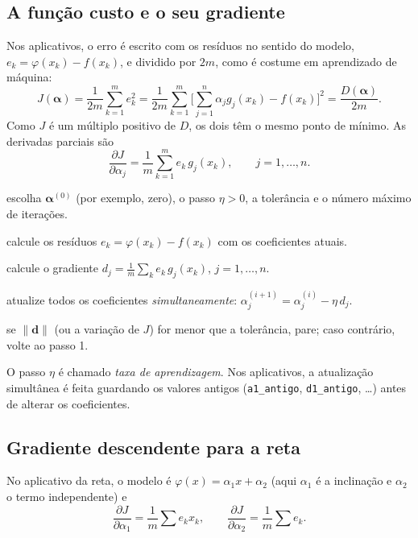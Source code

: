 \subsection{A função custo e o seu gradiente}

Nos aplicativos, o erro é escrito com os resíduos no sentido do modelo, $e_k=\varphi(x_k)-f(x_k)$, e
dividido por $2m$, como é costume em aprendizado de máquina:
\[
J(\boldsymbol\alpha)=\frac{1}{2m}\sum_{k=1}^{m}e_k^2=\frac{1}{2m}\sum_{k=1}^{m}\Big[\sum_{j=1}^{n}\alpha_jg_j(x_k)-f(x_k)\Big]^2=\frac{D(\boldsymbol\alpha)}{2m}.
\]
Como $J$ é um múltiplo positivo de $D$, os dois têm o mesmo ponto de mínimo. As derivadas parciais são
\[
\frac{\partial J}{\partial\alpha_j}=\frac1m\sum_{k=1}^{m}e_k\,g_j(x_k),\qquad j=1,\dots,n .
\]

\begin{tcolorbox}[colback=azul!3,colframe=azul!60,title={Algoritmo: gradiente descendente},fonttitle=\bfseries]
\begin{description}[nosep,font=\normalfont\bfseries]
  \item[Passo 0:] escolha $\boldsymbol\alpha^{(0)}$ (por exemplo, zero), o passo $\eta>0$, a tolerância e o número máximo de iterações.
  \item[Passo 1:] calcule os resíduos $e_k=\varphi(x_k)-f(x_k)$ com os coeficientes atuais.
  \item[Passo 2:] calcule o gradiente $d_j=\frac1m\sum_k e_k\,g_j(x_k)$, $j=1,\dots,n$.
  \item[Passo 3:] atualize todos os coeficientes \emph{simultaneamente}: $\alpha_j^{(i+1)}=\alpha_j^{(i)}-\eta\,d_j$.
  \item[Passo 4:] se $\|\mathbf d\|$ (ou a variação de $J$) for menor que a tolerância, pare; caso contrário, volte ao passo 1.
\end{description}
\end{tcolorbox}

O passo $\eta$ é chamado \emph{taxa de aprendizagem}. Nos aplicativos, a atualização simultânea é feita
guardando os valores antigos (\texttt{a1\_antigo}, \texttt{d1\_antigo}, \dots) antes de alterar os coeficientes.

\subsection{Gradiente descendente para a reta}\label{sec:gdreta}

No aplicativo da reta, o modelo é $\varphi(x)=\alpha_1x+\alpha_2$ (aqui $\alpha_1$ é a inclinação e
$\alpha_2$ o termo independente) e
\[
\frac{\partial J}{\partial\alpha_1}=\frac1m\sum e_kx_k,\qquad \frac{\partial J}{\partial\alpha_2}=\frac1m\sum e_k .
\]

